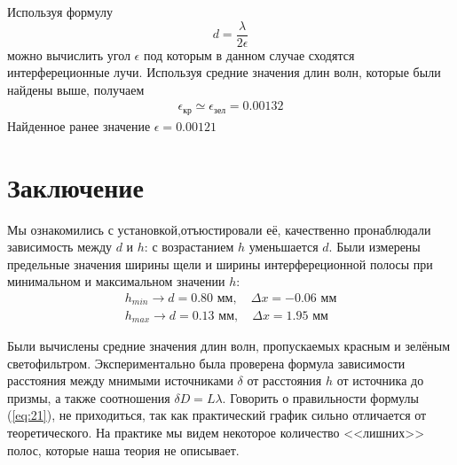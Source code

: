 Используя формулу 
\begin{equation}
	d=\frac{\lambda}{2\epsilon}	
\end{equation}
можно вычислить угол $\epsilon$ под которым в данном случае сходятся интерфереционные лучи. Используя средние значения длин волн, которые были найдены выше, получаем
\begin{gather*}
	\epsilon_{\text{кр}}\simeq\epsilon_{\text{зел}}=0.00132
\end{gather*}
 Найденное ранее значение $\epsilon=0.00121$

\section{Заключение}
Мы ознакомились с установкой,отъюстировали её, качественно пронаблюдали зависимость между $d$ и $h$: с возрастанием $h$ уменьшается $d$. Были измерены предельные значения ширины щели и ширины интерфереционной полосы при минимальном и максимальном значении $h$: 
\begin{gather*}
h_{min}\to d=0.80\text{ мм}, \quad \Delta x=-0.06\text{ мм}\\
h_{max}\to d=0.13\text{ мм}, \quad \Delta x=1.95\text{ мм} 	
\end{gather*}

Были вычислены средние значения длин волн, пропускаемых красным и зелёным светофильтром. Экспериментально была проверена формула зависимости расстояния между мнимыми источниками $\delta$ от расстояния $h$ от источника до призмы, а также соотношения $\delta D=L\lambda$. Говорить о правильности формулы (\ref{eq:21}), не приходиться, так как практический график сильно отличается от теоретического. На практике мы видем некоторое количество <<лишних>> полос, которые наша теория не описывает.
   
 